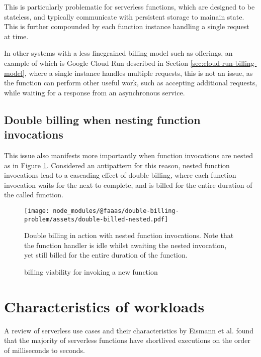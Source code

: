 This is particularly problematic for serverless functions, which are designed to be stateless, and typically communicate with persistent storage to mainain state. This is further compounded by each function instance handling a single request at time.

In other systems with a less finegrained billing model such as \caas{} offerings, an example of which is Google Cloud Run described in Section \ref{sec:cloud-run-billing-model}, where a single instance handles multiple requests, this is not an issue, as the function can perform other useful work, such as accepting additional requests, while waiting for a response from an asynchronous service.

\subsection{Double billing when nesting function invocations}
This issue also manifests more importantly when function invocations are nested as in Figure \ref{fig:double-billing-nested}. Considered an antipattern for this reason\cite{LambdaFunctionsCalling}, nested function invocations lead to a cascading effect of double billing, where each function invocation waits for the next to complete, and is billed for the entire duration of the called function.

\begin{figure}[t]
    \texttt{[image: node\_modules/@faaas/double-billing-problem/assets/double-billed-nested.pdf]}
    \caption{Double billing in action with nested function invocations. Note that the function handler is idle whilst awaiting the nested invocation, yet still billed for the entire duration of the function.}
    \label{fig:double-billing-nested}
\end{figure}

\begin{figure*}[t]
    \begin{center}
        
    \end{center}
    \caption{\faas{} billing viability for invoking a new function}
\end{figure*}

\section{Characteristics of \faas{} workloads}
A review of serverless use cases and their characteristics by Eismann et al.\cite{eismannReviewServerlessUse2020} found that the majority of serverless functions have shortlived executions on the order of milliseconds to seconds.

